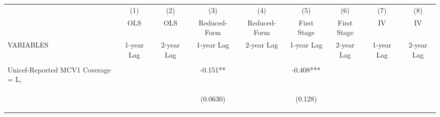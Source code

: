 \documentclass[]{article}
\begin{document}
\begin{center}
\begin{tabular}{lcccccccc} \hline
 & (1) & (2) & (3) & (4) & (5) & (6) & (7) & (8) \\
 & OLS & OLS & Reduced-Form & Reduced-Form & First Stage & First Stage & IV & IV \\
VARIABLES & 1-year Lag & 2-year Lag & 1-year Lag & 2-year Lag & 1-year Lag & 2-year Lag & 1-year Lag & 2-year Lag \\ \hline
\vspace{4pt} & \begin{footnotesize}\end{footnotesize} & \begin{footnotesize}\end{footnotesize} & \begin{footnotesize}\end{footnotesize} & \begin{footnotesize}\end{footnotesize} & \begin{footnotesize}\end{footnotesize} & \begin{footnotesize}\end{footnotesize} & \begin{footnotesize}\end{footnotesize} & \begin{footnotesize}\end{footnotesize} \\
Unicef-Reported MCV1 Coverage = L, &  &  & -0.151** &  & -0.408*** &  &  &  \\
\vspace{4pt} & \begin{footnotesize}\end{footnotesize} & \begin{footnotesize}\end{footnotesize} & \begin{footnotesize}(0.0630)\end{footnotesize} & \begin{footnotesize}\end{footnotesize} & \begin{footnotesize}(0.128)\end{footnotesize} & \begin{footnotesize}\end{footnotesize} & \begin{footnotesize}\end{footnotesize} & \begin{footnotesize}\end{footnotesize} \\

\end{tabular}
\end{center}
\end{document}
